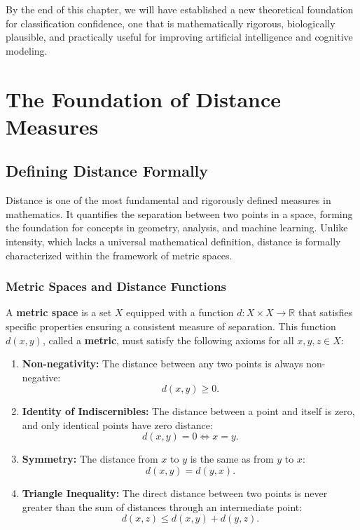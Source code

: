 \documentclass[12pt]{article}
\begin{document}
By the end of this chapter, we will have established a new theoretical foundation for classification confidence, one that is mathematically rigorous, biologically plausible, and practically useful for improving artificial intelligence and cognitive modeling.


\section{The Foundation of Distance Measures}
\subsection{Defining Distance Formally}

Distance is one of the most fundamental and rigorously defined measures in mathematics. It quantifies the separation between two points in a space, forming the foundation for concepts in geometry, analysis, and machine learning. Unlike intensity, which lacks a universal mathematical definition, distance is formally characterized within the framework of metric spaces.

\subsubsection{Metric Spaces and Distance Functions}

A \textbf{metric space} is a set \( X \) equipped with a function \( d: X \times X \to \mathbb{R} \) that satisfies specific properties ensuring a consistent measure of separation. This function \( d(x, y) \), called a \textbf{metric}, must satisfy the following axioms for all \( x, y, z \in X \):

\begin{enumerate}
    \item \textbf{Non-negativity:} The distance between any two points is always non-negative:
    \[
    d(x, y) \geq 0.
    \]
    \item \textbf{Identity of Indiscernibles:} The distance between a point and itself is zero, and only identical points have zero distance:
    \[
    d(x, y) = 0 \iff x = y.
    \]
    \item \textbf{Symmetry:} The distance from \( x \) to \( y \) is the same as from \( y \) to \( x \):
    \[
    d(x, y) = d(y, x).
    \]
    \item \textbf{Triangle Inequality:} The direct distance between two points is never greater than the sum of distances through an intermediate point:
    \[
    d(x, z) \leq d(x, y) + d(y, z).
    \]
\end{enumerate}
\end{document}
